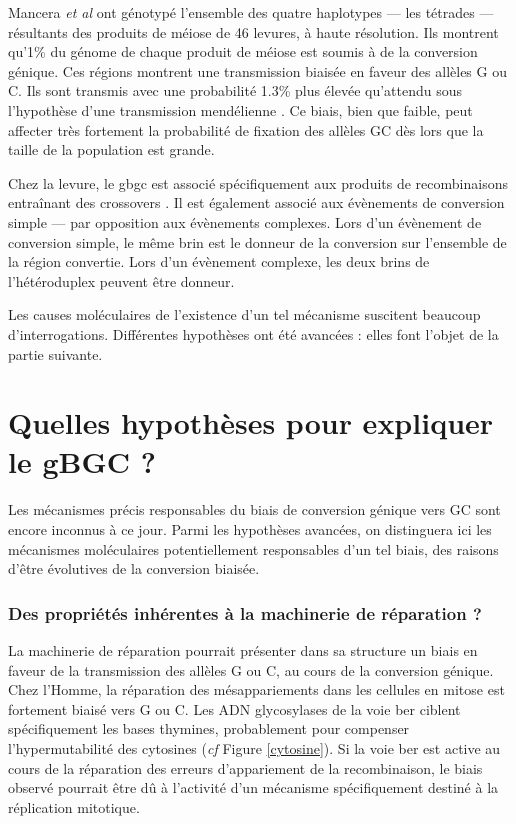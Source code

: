 \documentclass[11pt, oneside]{scrartcl}
\begin{document}
Mancera \emph{et al} \cite{mancera_high-resolution_2008} ont génotypé l'ensemble des
quatre haplotypes --- les tétrades --- résultants des produits de méiose de 46
levures, à haute résolution. Ils montrent qu'1\% du génome de chaque produit de
méiose est soumis à de la conversion génique. Ces régions montrent une
transmission biaisée en faveur des allèles G ou C. Ils sont transmis avec une
probabilité 1.3\% plus élevée qu'attendu sous l'hypothèse d'une transmission
mendélienne \cite{mancera_high-resolution_2008}. Ce biais, bien que faible, peut
affecter très fortement la probabilité de fixation des allèles GC dès lors que
la taille de la population est grande\cite{nagylaki_evolution_1983}. 

Chez la levure, le \ac{gbgc} est associé spécifiquement aux produits de
recombinaisons entraînant des crossovers \cite{lesecque_gc-biased_2013}. Il est
également associé aux évènements de conversion simple --- par opposition aux
évènements complexes. Lors d'un évènement de conversion simple, le même brin est
le donneur de la conversion sur l'ensemble de la région convertie. Lors d'un
évènement complexe, les deux brins de l'hétéroduplex peuvent être donneur. 

\begin{transition}
  Les causes moléculaires de l'existence d'un tel mécanisme suscitent beaucoup
  d'interrogations. Différentes hypothèses ont été avancées : elles font l'objet
  de la partie suivante. 
\end{transition}

\section{Quelles hypothèses pour expliquer le gBGC ?}
\label{sec:orgheadline11}
Les mécanismes précis responsables du biais de conversion génique vers GC sont
encore inconnus à ce jour. Parmi les hypothèses avancées, on distinguera ici les
mécanismes moléculaires potentiellement responsables d'un tel biais, des raisons
d'être évolutives de la conversion biaisée.

\subsubsection*{Des propriétés inhérentes à la machinerie de réparation ?}
\label{sec:orgheadline9}

La machinerie de réparation pourrait présenter dans sa structure un biais en
faveur de la transmission des allèles G ou C, au cours de la conversion génique.
Chez l'Homme, la réparation des mésappariements dans les cellules en mitose est
fortement biaisé vers G ou C. Les ADN glycosylases de la voie \ac{ber} ciblent
spécifiquement les bases thymines, probablement pour compenser l'hypermutabilité
des cytosines\cite{brown_specific_1987} (\emph{cf} Figure \ref{cytosine}). Si la voie
\ac{ber} est active au cours de la réparation des erreurs d'appariement de la
recombinaison, le biais observé pourrait être dû à l'activité d'un mécanisme
spécifiquement destiné à la réplication mitotique.
\end{document}
